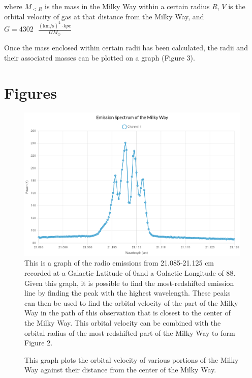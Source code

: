 \documentclass{article}
\begin{document}
where $M_{<R}$ is the mass in the Milky Way within a certain radius $R$, $V$ is the orbital velocity of gas at that distance from the Milky Way, and $G=4302\text{ }\frac{(\text{km/s})^2 \cdot kpc}{GM_{\odot}}$

Once the mass enclosed within certain radii has been calculated, the radii and their associated masses can be plotted on a graph (Figure 3).

\pagebreak

\section{Figures}
\begin{center}
    \begin{figure}[h!]
        \caption{
            This is a graph of the radio emissions from 21.085-21.125 cm recorded at a Galactic Latitude of 0\degree \space and a Galactic Longitude of 88\degree \space.
            Given this graph, it is possible to find the most-redshifted emission line by finding the peak with the highest wavelength.
            These peaks can then be used to find the orbital velocity of the part of the Milky Way in the path of this observation that is closest to the center of the Milky Way.
            This orbital velocity can be combined with the orbital radius of the most-redshifted part of the Milky Way to form Figure 2.
            \smallskip
        }
        \includegraphics[scale=0.2]{emission-graph-lab9.jpg}
        \centering
    \end{figure}
    \begin{figure}[h!]
        \caption{
            This graph plots the orbital velocity of various portions of the Milky Way against their distance from the center of the Milky Way.
}
\end{figure}
\end{center}
\end{document}
